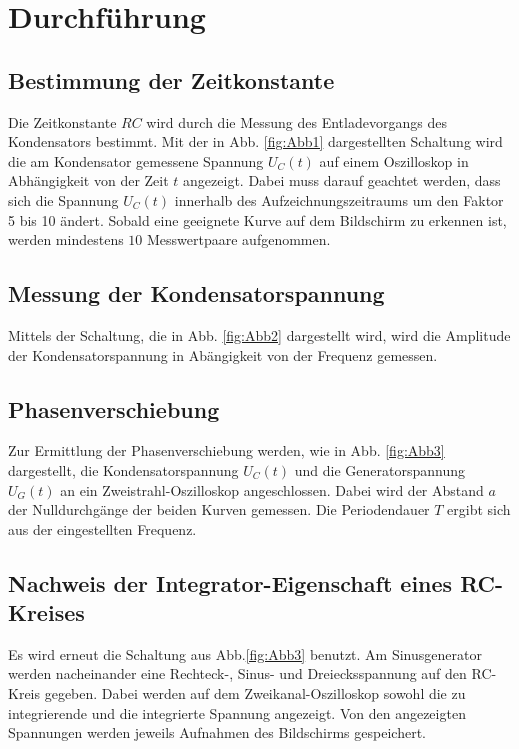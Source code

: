 \section{Durchführung}
\label{sec:Durchführung}

\subsection{Bestimmung der Zeitkonstante}
Die Zeitkonstante $RC$ wird durch die Messung des Entladevorgangs des Kondensators bestimmt. 
Mit der in Abb. \ref{fig:Abb1} dargestellten Schaltung wird die am Kondensator gemessene Spannung $U_{C}(t)$ auf einem
Oszilloskop in Abhängigkeit von der Zeit $t$ angezeigt. Dabei muss darauf geachtet werden, dass sich die Spannung 
$U_{C}(t)$ innerhalb des Aufzeichnungszeitraums um den Faktor 5 bis 10 ändert. Sobald eine geeignete Kurve auf dem 
Bildschirm zu erkennen ist, werden mindestens $10$ Messwertpaare aufgenommen.

\subsection{Messung der Kondensatorspannung}
Mittels der Schaltung, die in Abb. \ref{fig:Abb2} dargestellt wird, wird die Amplitude der Kondensatorspannung in 
Abängigkeit von der Frequenz gemessen.

\subsection{Phasenverschiebung}
Zur Ermittlung der Phasenverschiebung werden, wie in Abb. \ref{fig:Abb3} dargestellt, die Kondensatorspannung $U_{C}(t)$ 
und die Generatorspannung $U_{G}(t)$ an ein Zweistrahl-Oszilloskop angeschlossen. Dabei wird der Abstand $a$ der 
Nulldurchgänge der beiden Kurven gemessen. Die Periodendauer $T$ ergibt sich aus der eingestellten Frequenz.%

\subsection{Nachweis der Integrator-Eigenschaft eines RC-Kreises}
Es wird erneut die Schaltung aus Abb.\ref{fig:Abb3} benutzt. Am Sinusgenerator werden nacheinander eine Rechteck-, 
Sinus- und Dreiecksspannung auf den RC-Kreis gegeben. Dabei werden auf dem Zweikanal-Oszilloskop sowohl die 
zu integrierende und die integrierte Spannung angezeigt. Von den angezeigten Spannungen werden jeweils Aufnahmen
des Bildschirms gespeichert. 
